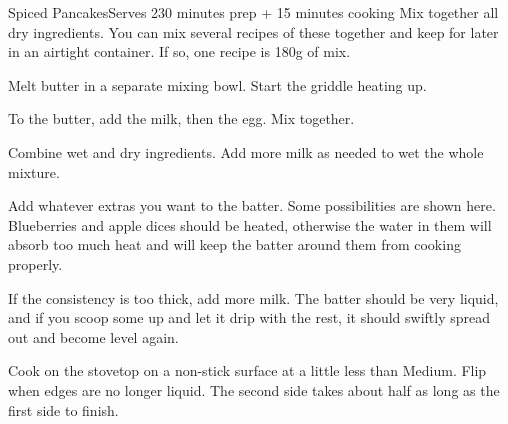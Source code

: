 \documentclass[../Cookbook.tex]{subfiles}
\begin{document}
\begin{recipe}{Spiced Pancakes}{Serves 2}{30 minutes prep + 15 minutes cooking}
	Mix together all dry ingredients.
	You can mix several recipes of these together and keep for later in an airtight container.
	If so, one recipe is 180g
	of mix.

	Melt butter in a separate mixing bowl. Start the griddle heating up.

	To the butter, add the milk, then the egg. Mix together.

	Combine wet and dry ingredients. Add more milk as needed to wet the whole mixture.

	Add whatever extras you want to the batter. Some possibilities are shown here.
	Blueberries and apple dices should be heated, otherwise the water in them will absorb too much heat and will keep the batter around them from cooking properly.

	If the consistency is too thick, add more milk. The batter should be very liquid, and if you scoop some up and let it drip with the rest, it should swiftly spread out and become level again.

	\newstep
	Cook on the stovetop on a non-stick surface at a little less than Medium.
	Flip when edges are no longer liquid.
	The second side takes about half as long as the first side to finish.
\end{recipe}
\end{document}
